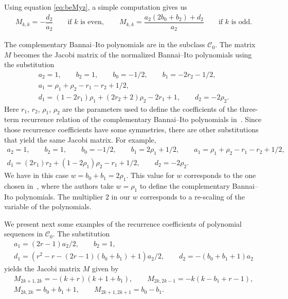 \documentclass[10pt,a4paper]{amsart}
\def\cC{\mathcal C}
\numberwithin{equation}{section}
\begin{document}
Using equation \eqref{eq:beMyz}, a simple computation gives us
\begin{gather*}%
	M_{k,k}= - \dfrac{d_2}{a_2} \qquad \text{if $k$ is even}, \qquad
	M_{k,k}= \dfrac{a_2 (2 b_0+b_2) + d_2}{a_2} \qquad \text{if $k$ is odd}.
\end{gather*}

The complementary Bannai--Ito polynomials are in the subclass $\cC_0$. The matrix $M$ becomes the Jacobi matrix of the normalized Bannai--Ito polynomials using the substitution
\begin{gather*}
a_2=1,\qquad b_2=1,\qquad b_0=-1/2,\qquad b_1=-2 r_2 -1/2,\\
a_1=\rho_1+\rho_2-r_1-r_2 +1/2, \\
d_1=(1-2 r_1) \rho_1 +(2 r_2+2) \rho_2- 2 r_1+1,\qquad d_2=-2 \rho_2.
\end{gather*}
Here $r_1$, $r_2$, $\rho_1$, $\rho_2$ are the parameters used to define the coefficients of the three-term recurrence relation of the complementary Bannai--Ito polynomials in~\cite[equations (3.4) and (3.5)]{GenVZ2}. Since those recurrence coefficients have some symmetries, there are other substitutions that yield the same Jacobi matrix. For example,
\begin{gather*}
a_2=1,\qquad b_2=1,\qquad b_0=-1/2,\qquad b_1= 2 \rho_1 +1/2,\qquad a_1=\rho_1+\rho_2-r_1-r_2 +1/2, \\
 d_1=(2 r_1) r_2 +(1- 2 \rho_1) \rho_2 - r_1 +1/2,\qquad d_2=-2 \rho_2.
\end{gather*}
We have in this case $w=b_0+b_1=2 \rho_1$. This value for $w$ corresponds to the one chosen in~\cite[equation~(5.11)]{TsujiDunkl}, where the authors take $w=\rho_1$ to define the complementary Bannai--Ito polynomials. The multiplier $2$ in our $w$ corresponds to a re-scaling of the variable of the polynomials.

We present next some examples of the recurrence coefficients of polynomial sequences in $\cC_0$.
The substitution
\begin{gather*}
 a_1=(2r-1) a_2/2, \qquad b_2=1,\\
 d_1=(r^2-r -(2r-1)(b_0+b_1) +1) a_2/2, \qquad d_2=-(b_0+b_1+1)a_2
 \end{gather*}
yields the Jacobi matrix $M$ given by
\begin{gather*}%
	M_{2k+1,2k}= -(k+r) (k+1+b_1), \qquad
	M_{2k,2k-1}= -k (k-b_1+r-1),\\
	M_{2k,2k}= b_0+b_1+1,\qquad
	M_{2k+1,2k+1}= b_0-b_1.
\end{gather*}
\end{document}
